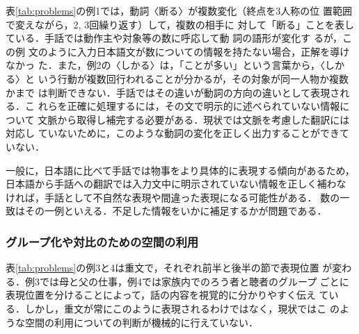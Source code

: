 \documentclass[japanese]{jnlp_1.4}
\begin{document}
表\ref{tab:problems}の例1では，動詞〈断る〉が複数変化（終点を3人称の位
置範囲で変えながら，2, 3回繰り返す）して，複数の相手に
対して「断る」ことを表している．手話では動作主や対象等の数に呼応して動
詞の語形が変化す
る\cite{Oka2005,Matsumoto2001,Sandler2006,Sutton-Spence1999}が，この例
文のように入力日本語文が数についての情報を持たない場合，正解を導けなかっ
た．また，例2の〈しかる〉は，「ことが多い」という言葉から，〈しかる〉と
いう行動が複数回行われることが分かるが，その対象が同一人物か複数かまで
は判断できない．手話ではその違いが動詞の方向の違いとして表現される．こ
れらを正確に処理するには，その文で明示的に述べられていない情報について
文脈から取得し補完する必要がある．現状では文脈を考慮した翻訳には対応し
ていないために，このような動詞の変化を正しく出力することができていない．

一般に，日本語に比べて手話では物事をより具体的に表現する傾向があるため，
日本語から手話への翻訳では入力文中に明示されていない情報を正しく補わな
ければ，手話として不自然な表現や間違った表現になる可能性がある．
数の一致はその一例といえる．不足した情報をいかに補足するかが問題である．



\subsubsection{グループ化や対比のための空間の利用}

表\ref{tab:problems}の例3と4は重文で，それぞれ前半と後半の節で表現位置
が変わる．例3では母と父の仕事，例4では家族内でのろう者と聴者のグループ
ごとに表現位置を分けることによって，話の内容を視覚的に分かりやすく伝え
ている．しかし，重文が常にこのように表現されるわけではなく，現状ではこ
のような空間の利用についての判断が機械的に行えていない．
\end{document}
